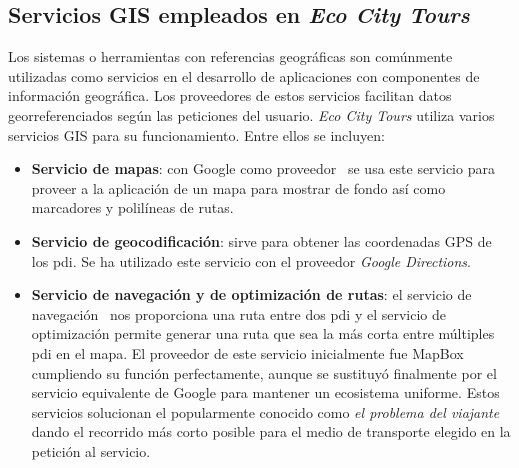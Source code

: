 	\subsection{Servicios GIS empleados en \textit{Eco City Tours}}
	Los sistemas o herramientas con referencias geográficas son comúnmente utilizadas como servicios en el desarrollo de aplicaciones con componentes de información geográfica. Los proveedores de estos servicios facilitan datos georreferenciados según las peticiones del usuario. \textit{Eco City Tours} utiliza varios servicios GIS para su funcionamiento. Entre ellos se incluyen:
	\begin{itemize}
		\item \textbf{Servicio de mapas}: con Google como proveedor~\cite{google_maps} se usa este servicio para proveer a la aplicación de un mapa para mostrar de fondo así como marcadores y polilíneas de rutas.
		
				\item \textbf{Servicio de geocodificación}: sirve para obtener las coordenadas GPS de los \acrlong{pdi}. Se ha utilizado este servicio con el proveedor \textit{Google Directions}.

		\item \textbf{Servicio de navegación y de optimización de rutas}: el servicio de navegación~\cite{mapbox_directions} nos proporciona una ruta entre dos \acrlong{pdi} y el servicio de optimización permite generar una ruta que sea la más corta entre múltiples \acrshort{pdi} en el mapa. El proveedor de este servicio inicialmente fue MapBox~\cite{mapbox_optimization} cumpliendo su función perfectamente, aunque se sustituyó finalmente por el servicio equivalente de Google para mantener un ecosistema uniforme. Estos servicios solucionan el popularmente conocido como \textit{el problema del viajante}~\cite{ubu_algoritmia} dando el recorrido más corto posible para el medio de transporte elegido en la petición al servicio.
		
	\end{itemize}
	
